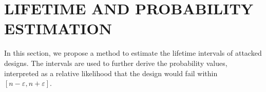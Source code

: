 
\begin{comment}
\section{LIFETIME ESTIMATION}
\label{sec:lt_estimation}
In this section, we propose a method to estimate the lifetime interval of attacked designs, considering the workload variations based on the aforementioned assumption and definition of critical operational mode.

Based on the assumption, the union of critical operational modes of all candidate paths is equivalent to the universal set of operational modes, i.e., all operational modes. Thus, for the purpose of covering all operational modes, we have to consider the severe aging condition of each candidate path, such that the associated critical operational modes are applied to predict the lifetime of other paths using a binary search method.

For example, given the candidate path $i$, the other path $j$, and time variable $t$, the goal of the method is to predict $j's$ lifetime by binarily searching toward a convergent $t$. That is, during the binary search, the timing variable $t$ will be iteratively calibrated according to the $j's$ setup timing constraint, formulated in Equation~(\ref{eq:setup}), and eventually $j's$ lifetime will converge toward the value of $t$. Where $j's$ aging rate is derived by the aging correlation between $i$ and $j$ (i.e., regression equation of $i$ on $j$) and $i's$ aging rate is derived from Equation~(\ref{eq:worst}). 
As a result, when $i$ is considered undergoing severe aging, we can obtain the other paths' lifetimes, among which we choose the smallest one as the lifetime of the attacked design.

In accordance with the former procedure, we can derive one lifetime value of a path being compromised with malicious aging. By considering all candidate paths undergoing severe aging, we can derive a group of lifetime values, among which smallest one and biggest one are the resulting interval based on the attack.
\end{comment}
\section{LIFETIME AND PROBABILITY ESTIMATION}
\label{sec:lt_estimation}
In this section, we propose a method to estimate the lifetime intervals of attacked designs. The intervals are used to further derive the probability values, interpreted as a relative likelihood that the design would fail within $[n-\varepsilon, n+\varepsilon]$.

